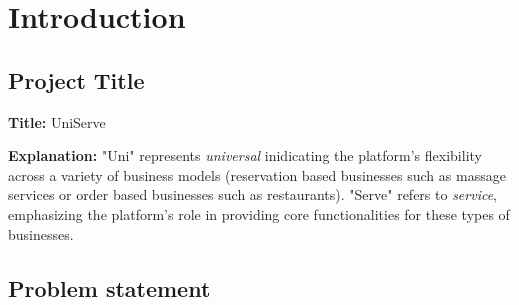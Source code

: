 \documentclass[]{VUMIFTemplateClass}
\begin{document}

\onehalfspacing


\singlespacing
{}


\tableofcontents
\onehalfspacing




\section{Introduction}
\subsection{Project Title}

\textbf{Title:} UniServe

\textbf{Explanation:} "Uni" represents \emph{universal} inidicating the platform's flexibility across a variety of business models 
(reservation based businesses such as massage services or order based businesses such as restaurants). 
"Serve" refers to \emph{service}, emphasizing the platform’s role in providing core functionalities for these types of businesses.

\subsection{Problem statement}



\end{document}
